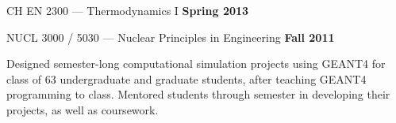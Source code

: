 % 
\begin{list2}
\item CH EN 2300 ---  Thermodynamics I \hfill {\bf Spring 2013}
\item NUCL 3000 / 5030 ---  Nuclear Principles in Engineering \hfill {\bf Fall 2011}






\begin{list1}
\item[] Designed semester-long computational simulation projects using GEANT4 for class of 63
undergraduate and graduate students, after teaching GEANT4 programming to class.
Mentored students through semester in developing their projects, as well as coursework.

\end{list1}
\end{list2}


% 
% 


